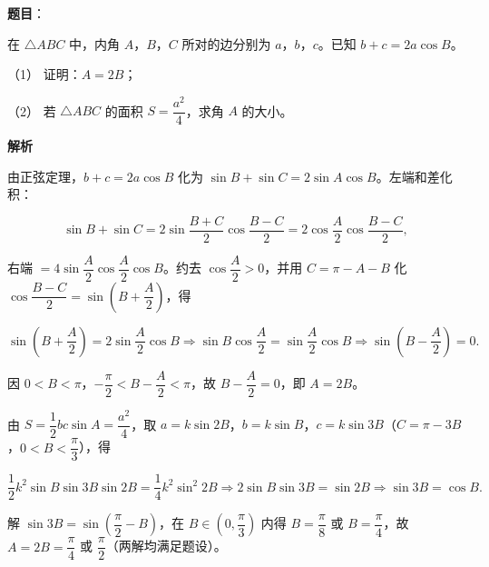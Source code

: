 \begin{answer}

\textbf{题目}：

在 \(\triangle ABC\) 中，内角 \(A\)，\(B\)，\(C\) 所对的边分别为 \(a\)，\(b\)，\(c\)。已知 \(b+c=2a\cos B\)。

（1） 证明：\(A=2B\)；

（2） 若 \(\triangle ABC\) 的面积 \(S=\dfrac{a^{2}}{4}\)，求角 \(A\) 的大小。

\textbf{解析}


由正弦定理，\(b+c=2a\cos B\) 化为 \(\sin B+\sin C=2\sin A\cos B\)。左端和差化积：

\nopagebreak[4]
\[
\sin B+\sin C=2\sin\dfrac{B+C}{2}\cos\dfrac{B-C}{2}=2\cos\dfrac{A}{2}\cos\dfrac{B-C}{2},
\]

右端 \(=4\sin\dfrac{A}{2}\cos\dfrac{A}{2}\cos B\)。约去 \(\cos\dfrac{A}{2}>0\)，并用 \(C=\pi-A-B\) 化 \(\cos\dfrac{B-C}{2}=\sin\left(B+\dfrac{A}{2}\right)\)，得

\nopagebreak[4]
\[
\sin\left(B+\dfrac{A}{2}\right)=2\sin\dfrac{A}{2}\cos B\Longrightarrow\sin B\cos\dfrac{A}{2}=\sin\dfrac{A}{2}\cos B\Longrightarrow\sin\left(B-\dfrac{A}{2}\right)=0.
\]

因 \(0<B<\pi\)，\(-\dfrac{\pi}{2}<B-\dfrac{A}{2}<\pi\)，故 \(B-\dfrac{A}{2}=0\)，即 \(A=2B\)。


由 \(S=\dfrac{1}{2}bc\sin A=\dfrac{a^{2}}{4}\)，取 \(a=k\sin 2B\)，\(b=k\sin B\)，\(c=k\sin 3B\)（\(C=\pi-3B\)，\(0<B<\dfrac{\pi}{3}\)），得

\nopagebreak[4]
\[
\dfrac{1}{2}k^{2}\sin B\sin 3B\sin 2B=\dfrac{1}{4}k^{2}\sin^{2}2B\Longrightarrow 2\sin B\sin 3B=\sin 2B\Longrightarrow\sin 3B=\cos B.
\]

解 \(\sin 3B=\sin\left(\dfrac{\pi}{2}-B\right)\)，在 \(B\in\left(0,\dfrac{\pi}{3}\right)\) 内得 \(B=\dfrac{\pi}{8}\) 或 \(B=\dfrac{\pi}{4}\)，故 \(A=2B=\dfrac{\pi}{4}\) 或 \(\dfrac{\pi}{2}\)（两解均满足题设）。



\end{answer}
